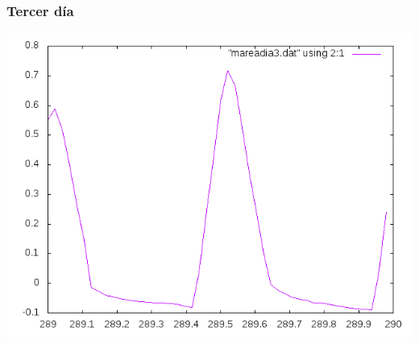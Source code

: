 \documentclass[10pt]{article}
\begin{document}
\subsubsection{Tercer día}
\begin{center}
   \includegraphics[scale=0.8]{day3.png}
\end{center}









\end{document}
